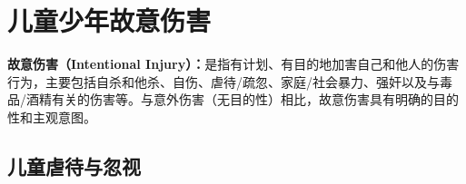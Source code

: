 \section{儿童少年故意伤害}

\begin{defbox}
\textbf{故意伤害（Intentional Injury）：}是指有计划、有目的地加害自己和他人的伤害行为，主要包括自杀和他杀、自伤、虐待/疏忽、家庭/社会暴力、强奸以及与毒品/酒精有关的伤害等。与意外伤害（无目的性）相比，故意伤害具有明确的目的性和主观意图。
\end{defbox}

\subsection{儿童虐待与忽视}

